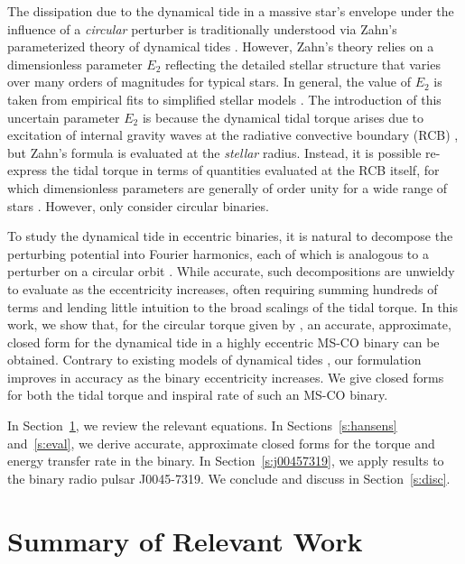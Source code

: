 \documentclass[
        fleqn,
        usenatbib,
    ]{mnras}
\begin{document}
The dissipation due to the dynamical tide in a massive star's envelope under the
influence of a \emph{circular} perturber is traditionally understood via Zahn's
parameterized theory of dynamical tides \citep{zahn1975dynamical}. However,
Zahn's theory relies on a dimensionless parameter $E_2$ reflecting the detailed
stellar structure that varies over many orders of magnitudes for typical stars.
In general, the value of $E_2$ is taken from empirical fits to simplified
stellar models \citep{hurley2002evolution, vigna2020common}. The introduction of
this uncertain parameter $E_2$ is because the dynamical tidal torque arises due
to excitation of internal gravity waves at the radiative convective boundary
(RCB) \citep{goldreich1989tidal, savonije1983tidal}, but Zahn's formula is
evaluated at the \emph{stellar} radius. Instead, it is possible re-express the
tidal torque in terms of quantities evaluated at the RCB itself, for which
dimensionless parameters are generally of order unity for a wide range of stars
\citep{kushnir}. However, \citet{kushnir} only consider circular binaries.

To study the dynamical tide in eccentric binaries, it is natural to decompose
the perturbing potential into Fourier harmonics, each of which is analogous to a
perturber on a circular orbit \citep[e.g.][]{sl, vlf}. While accurate, such
decompositions are unwieldy to evaluate as the eccentricity increases, often
requiring summing hundreds of terms and lending little intuition to the broad
scalings of the tidal torque. In this work, we show that, for the circular
torque given by \citet{kushnir}, an accurate, approximate, closed form for the
dynamical tide in a highly eccentric MS-CO binary can be obtained. Contrary to
existing models of dynamical tides \citep[e.g.][]{vigna2020common}, our
formulation improves in accuracy as the binary eccentricity increases.  We give
closed forms for both the tidal torque and inspiral rate of such an MS-CO
binary.

In Section~\ref{s:background}, we review the relevant equations. In
Sections~\ref{s:hansens} and~\ref{s:eval}, we derive accurate, approximate
closed forms for the torque and energy transfer rate in the binary. In
Section~\ref{s:j00457319}, we apply results to the binary radio pulsar
J0045-7319. We conclude and discuss in Section~\ref{s:disc}.

\section{Summary of Relevant Work}\label{s:background}
\end{document}
